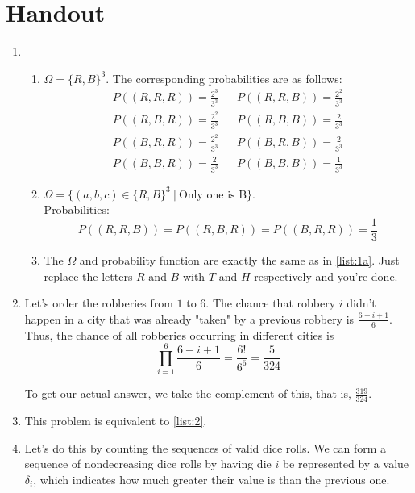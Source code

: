 \documentclass[12pt]{article}
\begin{document}
\section{Handout}\label{sec:handout}
\begin{enumerate}
    \item \begin{enumerate}
              \item $\Omega=\{R, B\}^3$.
                    The corresponding probabilities are as follows:
                    \begin{align*}
                        P((R, R, R)) = \frac{2^3}{3^3} &  & P((R, R, B)) = \frac{2^2}{3^3} \\
                        P((R, B, R)) = \frac{2^2}{3^3} &  & P((R, B, B)) = \frac{2}{3^3}   \\
                        P((B, R, R)) = \frac{2^2}{3^3} &  & P((B, R, B)) = \frac{2}{3^3}   \\
                        P((B, B, R)) = \frac{2}{3^3}   &  & P((B, B, B)) = \frac{1}{3^3}
                    \end{align*} \label{list:1a}
              \item $\Omega=\{(a, b, c) \in \{R, B\}^3\ |\ \text{Only one is B}\}$. \\
                    Probabilities:
                    \[P((R, R, B))=P((R, B, R))=P((B, R, R))=\frac{1}{3}\]
              \item The $\Omega$ and probability function are exactly the same as in \ref{list:1a}.
                    Just replace the letters $R$ and $B$ with $T$ and $H$ respectively and you're done.
          \end{enumerate}
    \item Let's order the robberies from $1$ to $6$.
          The chance that robbery $i$ didn't happen in a city that was already "taken" by a previous robbery is $\frac{6-i+1}{6}$.
          Thus, the chance of all robberies occurring in different cities is
          \[\prod_{i=1}^{6} \frac{6-i+1}{6}=\frac{6!}{6^6}=\frac{5}{324}\]

          To get our actual answer, we take the complement of this, that is, $\boxed{\frac{319}{324}}$. \label{list:2}
    \item This problem is equivalent to \ref{list:2}. \label{list:3}
    \item Let's do this by counting the sequences of valid dice rolls.
          We can form a sequence of nondecreasing dice rolls by having die $i$ be represented by a value $\delta_i$,
          which indicates how much greater their value is than the previous one.


\end{enumerate}
\end{document}
